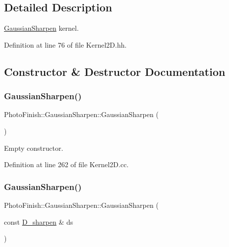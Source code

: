 \subsection{Detailed Description}
\hyperlink{class_photo_finish_1_1_gaussian_sharpen}{Gaussian\+Sharpen} kernel. 

Definition at line 76 of file Kernel2\+D.\+hh.



\subsection{Constructor \& Destructor Documentation}
\mbox{\label{class_photo_finish_1_1_gaussian_sharpen_aee3963e9acb80f4243a7eb048a56d03a}} 
\subsubsection{\texorpdfstring{Gaussian\+Sharpen()}{GaussianSharpen()}\hspace{0.1cm}{\footnotesize\ttfamily [1/2]}}
{\footnotesize\ttfamily Photo\+Finish\+::\+Gaussian\+Sharpen\+::\+Gaussian\+Sharpen (\begin{DoxyParamCaption}{ }\end{DoxyParamCaption})}



Empty constructor. 



Definition at line 262 of file Kernel2\+D.\+cc.

\mbox{\label{class_photo_finish_1_1_gaussian_sharpen_a71b8726201f26eb9b290f1edb37c4c5d}} 
\subsubsection{\texorpdfstring{Gaussian\+Sharpen()}{GaussianSharpen()}\hspace{0.1cm}{\footnotesize\ttfamily [2/2]}}
{\footnotesize\ttfamily Photo\+Finish\+::\+Gaussian\+Sharpen\+::\+Gaussian\+Sharpen (\begin{DoxyParamCaption}\item[{const \hyperlink{class_photo_finish_1_1_d__sharpen}{D\+\_\+sharpen} \&}]{ds }\end{DoxyParamCaption})}



